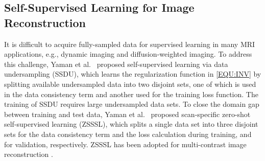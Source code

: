 \documentclass[journal,twoside,web]{ieeecolor}
\begin{document}


    \subsection{Self-Supervised Learning for Image Reconstruction}

    It is difficult to acquire fully-sampled data
    for supervised learning in many MRI applications,
    e.g., dynamic imaging and diffusion-weighted imaging.
    To address this challenge, Yaman et al.~\cite{yaman_2020_ssdu}
    proposed self-supervised learning via data undersampling (SSDU),
    which learns the regularization function in \cref{EQU:INV}
    by splitting available undersampled data into two disjoint sets,
    one of which is used in the data consistency term and
    another used for the training loss function.
    The training of SSDU requires large undersampled data sets.
    To close the domain gap between training and test data,
    Yaman et al.~\cite{yaman_2022_zs} proposed
    scan-specific zero-shot self-supervised learning (ZSSSL),
    which splits a single data set into three disjoint sets
    for the data consistency term and the loss calculation during training,
    and for validation, respectively.
    ZSSSL has been adopted for multi-contrast image reconstruction
    \cite{heydari_2024_jmaple}.
\end{document}
